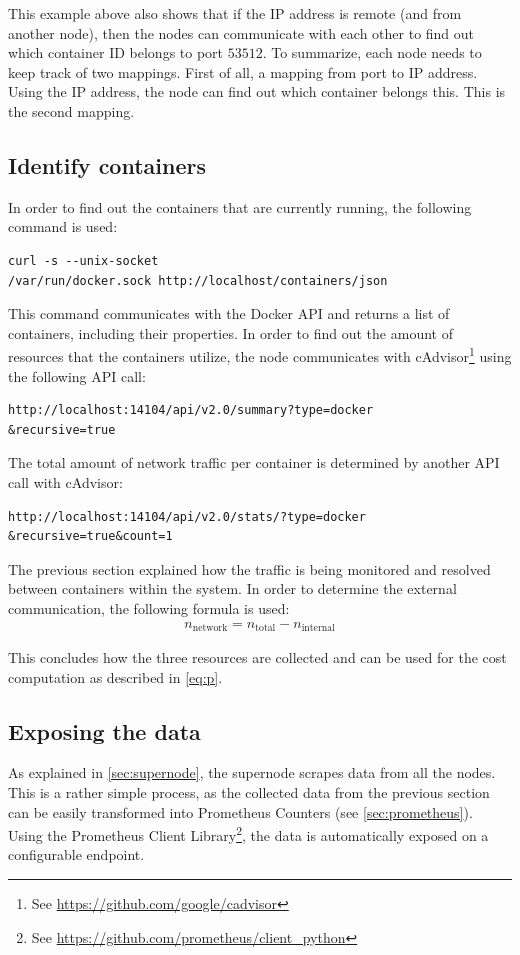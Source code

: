 \noindent
This example above also shows that if the IP address is remote (and from another node), then the nodes can communicate with each other to find out which container ID belongs to port $53512$. To summarize, each node needs to keep track of two mappings. First of all, a mapping from port to IP address. Using the IP address, the node can find out which container belongs this. This is the second mapping.

\subsection{Identify containers}
In order to find out the containers that are currently running, the following command is used:
\begin{verbatim}
curl -s --unix-socket 
/var/run/docker.sock http://localhost/containers/json
\end{verbatim}

\noindent
This command communicates with the Docker API and returns a list of containers, including their properties. In order to find out the amount of resources that the containers utilize, the node communicates with cAdvisor\footnote{See \url{https://github.com/google/cadvisor}} using the following API call:
\begin{verbatim}
http://localhost:14104/api/v2.0/summary?type=docker
&recursive=true
\end{verbatim}

\noindent
The total amount of network traffic per container is determined by another API call with cAdvisor:
\begin{verbatim}
http://localhost:14104/api/v2.0/stats/?type=docker
&recursive=true&count=1
\end{verbatim}

\noindent
The previous section explained how the traffic is being monitored and resolved between containers within the system. In order to determine the external communication, the following formula is used:
\begin{align} \label{formula:traffic}
n_\text{network} = n_\text{total} - n_\text{internal}
\end{align}

\noindent
This concludes how the three resources are collected and can be used for the cost computation as described in \autoref{eq:p}.

\subsection{Exposing the data} \label{sec:exposing_data}
As explained in \autoref{sec:supernode}, the supernode scrapes data from all the nodes. This is a rather simple process, as the collected data from the previous section can be easily transformed into Prometheus Counters (see \autoref{sec:prometheus}). Using the Prometheus Client Library\footnote{See \url{https://github.com/prometheus/client_python}}, the data is automatically exposed on a configurable endpoint.\\

